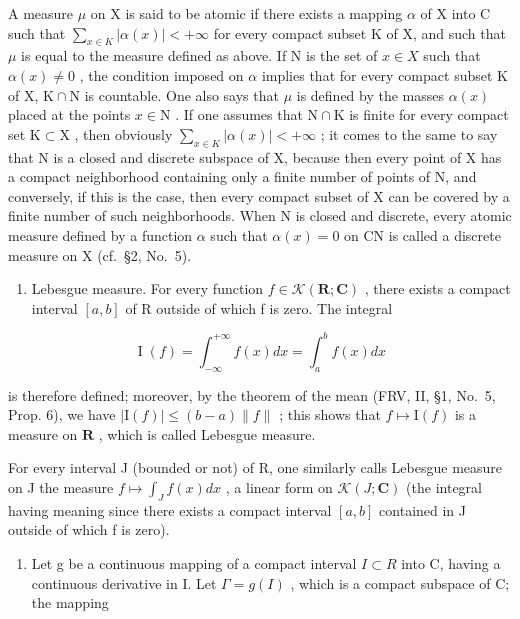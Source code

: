 A measure \(\mu\) on X is said to be atomic if there exists a mapping \(\alpha\) of X into C such that \(\sum_{x\in K}|\alpha (x)| < +\infty\) for every compact subset K of X, and such that \(\mu\) is equal to the measure defined as above. If N is the set of \(x\in X\) such that \(\alpha (x)\neq 0\) , the condition imposed on \(\alpha\) implies that for every compact subset K of X, \(\mathrm{K}\cap \mathrm{N}\) is countable. One also says that \(\mu\) is defined by the masses \(\alpha (x)\) placed at the points \(x\in \mathrm{N}\) . If one assumes that \(\mathrm{N}\cap \mathrm{K}\) is finite for every compact set \(\mathrm{K}\subset \mathrm{X}\) , then obviously \(\sum_{x\in K}|\alpha (x)| < +\infty\) ; it comes to the same to say that N is a closed and discrete subspace of X, because then every point of X has a compact neighborhood containing only a finite number of points of N, and conversely, if this is the case, then every compact subset of X can be covered by a finite number of such neighborhoods. When N is closed and discrete, every atomic measure defined by a function \(\alpha\) such that \(\alpha(x)=0\) on CN is called a discrete measure on X (cf.~§2, No.~5).

\begin{enumerate}
\def\labelenumi{\Roman{enumi}.}
\setcounter{enumi}{1}
\tightlist
\item
  Lebesgue measure. For every function \(f \in \mathcal{K}(\mathbf{R}; \mathbf{C})\) , there exists a compact interval \([a, b]\) of R outside of which f is zero. The integral
\end{enumerate}

\[
\operatorname{I} (f) = \int_ {- \infty} ^ {+ \infty} f (x) d x = \int_ {a} ^ {b} f (x) d x
\]

is therefore defined; moreover, by the theorem of the mean (FRV, II, §1, No.~5, Prop. 6), we have \(|\mathrm{I}(f)| \leqslant (b - a) \| f \|\) ; this shows that \(f \mapsto \mathrm{I}(f)\) is a measure on \(\mathbf{R}\) , which is called Lebesgue measure.

For every interval J (bounded or not) of R, one similarly calls Lebesgue measure on J the measure \(f \mapsto \int_{J} f(x) dx\) , a linear form on \(\mathcal{K}(J; \mathbf{C})\) (the integral having meaning since there exists a compact interval \([a, b]\) contained in J outside of which f is zero).

\begin{enumerate}
\def\labelenumi{\Roman{enumi}.}
\setcounter{enumi}{2}
\tightlist
\item
  Let g be a continuous mapping of a compact interval \(I \subset R\) into C, having a continuous derivative in I. Let \(\Gamma = g(I)\) , which is a compact subspace of C; the mapping
\end{enumerate}

